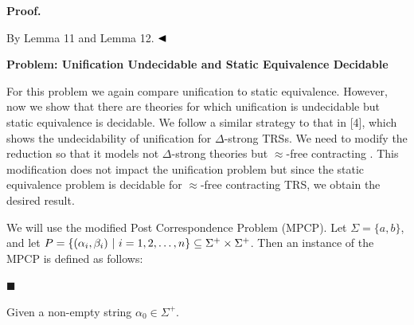 \documentclass[10pt,a4paper]{amsart}
\begin{document}

 
 
\par\medskip\noindent\textbf{Proof.}\par
 
 
By Lemma 11 and Lemma 12. $\hfill\blacktriangleleft$\par
 
 
 
 
 
\par\medskip\noindent\textbf{Problem: Unification Undecidable and Static Equivalence Decidable}\par
 
 
For this problem we again compare unification to static equivalence. However, now we show that there are theories for which unification is undecidable but static equivalence is decidable. We follow a similar strategy to that in [4], which shows the undecidability of unification for $\Delta$-strong TRSs. We need to modify the reduction so that it models not $\Delta$-strong theories but $\approx$-free contracting . This modification does not impact the unification problem but since the static equivalence problem is decidable for $\approx$-free contracting TRS, we obtain the desired result.\par
 
 
 
We will use the modified Post Correspondence Problem (MPCP). Let $\Sigma=\{a,b\}$, and let $P=\{(\alpha_{i},\beta_{i})\leavevmode\nobreak\ |\leavevmode\nobreak\ i=1,2,%
\ldots,n\}\subseteq\Sigma^{+}\times\Sigma^{+}$. Then an instance of the MPCP is defined as follows:\par
  
\par\noindent  $\blacksquare$ 
 
Given a non-empty string $\alpha_{0}\in\Sigma^{+}$.\par
 
 
\end{document}
